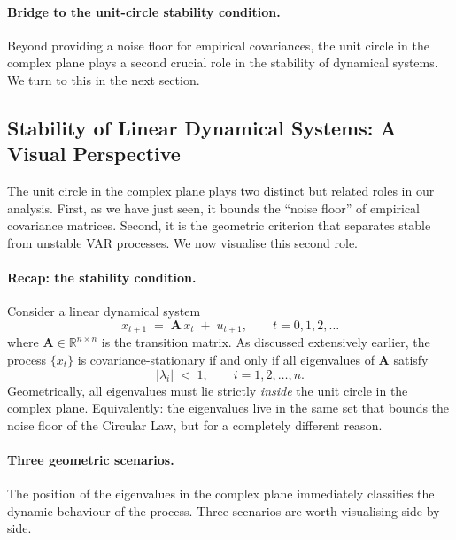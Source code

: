 \documentclass[11pt, a4paper, oneside]{article}
\begin{document}
\paragraph{Bridge to the unit-circle stability condition.}
Beyond providing a noise floor for empirical covariances, the unit
circle in the complex plane plays a second crucial role in the
stability of dynamical systems. We turn to this in the next section.

\newpage 

\subsection{Stability of Linear Dynamical Systems: A Visual Perspective}
\label{sec:appendix-stability-visual}

The unit circle in the complex plane plays two distinct but related
roles in our analysis. First, as we have just seen, it bounds the
``noise floor'' of empirical covariance matrices. Second, it is the
geometric criterion that separates stable from unstable VAR
processes. We now visualise this second role.

\paragraph{Recap: the stability condition.}
Consider a linear dynamical system
\[
x_{t+1} \;=\; \mathbf{A}\, x_t \;+\; u_{t+1}, \qquad t = 0, 1, 2, \ldots
\]
where $\mathbf{A} \in \mathbb{R}^{n \times n}$ is the transition
matrix. As discussed extensively earlier, the process $\{x_t\}$ is
covariance-stationary if and only if all eigenvalues of $\mathbf{A}$
satisfy
\[
|\lambda_i| \;<\; 1, \qquad i = 1, 2, \ldots, n.
\]
Geometrically, all eigenvalues must lie strictly \emph{inside} the
unit circle in the complex plane. Equivalently: the eigenvalues live
in the same set that bounds the noise floor of the Circular Law,
but for a completely different reason.

\paragraph{Three geometric scenarios.}
The position of the eigenvalues in the complex plane immediately
classifies the dynamic behaviour of the process. Three scenarios are
worth visualising side by side.
\end{document}
